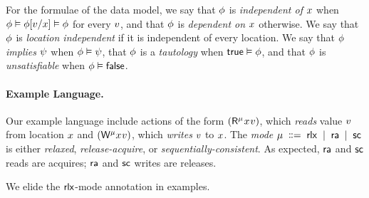 
For the formulae of the data model,
we say that $\phi$ is \emph{independent of $x$} when
$\phi \vDash \phi[v/x] \vDash \phi$ for every $v$, and that
$\phi$ is \emph{dependent on $x$} otherwise.  We say that $\phi$ is
\emph{location independent} if it is independent of every location.
%
We say that $\phi$ \emph{implies} $\psi$ when $\phi\vDash\psi$,
that $\phi$ is a \emph{tautology} when $\mathsf{true}\vDash\phi$, and that
$\phi$ is \emph{unsatisfiable} when $\phi\vDash\mathsf{false}$.

\paragraph{Example Language.}
Our example language include actions of the form
$(\DR[\amode]{\aLoc}{\aVal})$, which \emph{reads} value $v$ from location
$x$ and $(\DW[\amode]{\aLoc}{\aVal})$, which \emph{writes} $v$ to
$x$.
The \emph{mode} $\mu \;\mathrel{\mathord{\vcentcolon}\mkern-1mu\mathord{\vcentcolon}\mathord{{=}}}\; {\mathsf{rlx}} \;\mathrel{|}\; {\mathsf{ra}} \;\mathrel{|}\; {\mathsf{sc}}$ is
either \emph{relaxed}, \emph{release-acquire}, or
\emph{sequentially-consistent}.
As expected, ${\mathsf{ra}}$ and ${\mathsf{sc}}$ reads are acquires; ${\mathsf{ra}}$ and
${\mathsf{sc}}$ writes are releases.

We elide the ${\mathsf{rlx}}$-mode annotation in examples.

